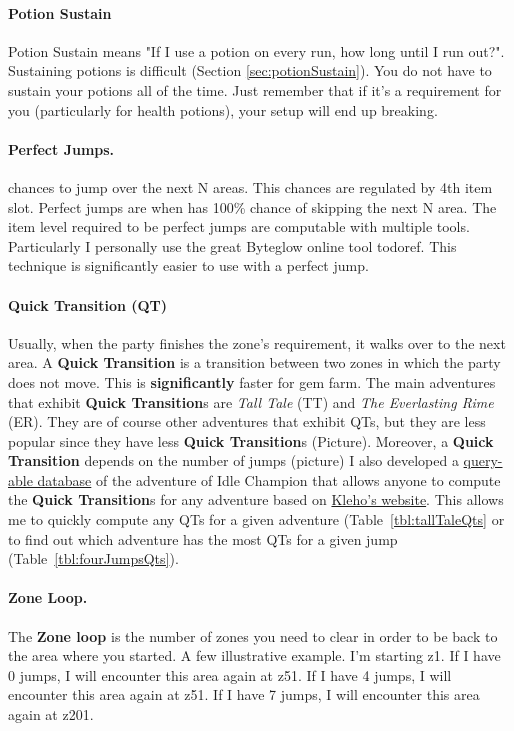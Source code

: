 \documentclass{article}
\begin{document}
\paragraph{Potion Sustain}

Potion Sustain means "If I use a potion on every run, how long until I run out?".
Sustaining potions is difficult (Section \ref{sec:potionSustain}).
You do not have to sustain your potions all of the time.
Just remember that if it's a requirement for you (particularly for health potions), your setup will end up breaking.


\paragraph{Perfect Jumps.}

\briv chances to jump over the next N areas.
This chances are regulated by \briv 4th item slot.
Perfect jumps are when \briv has 100\% chance of skipping the next N area.
The item level required to be perfect jumps are computable with multiple tools.
Particularly I personally use the great Byteglow online tool todoref.
This technique is significantly easier to use with a perfect jump. 

\paragraph{Quick Transition (QT)}

Usually, when the party finishes the zone's requirement, it walks over to the next area.
A \textbf{Quick Transition} is a transition between two zones in which the party does not move.
This is \textbf{significantly} faster for gem farm.
The main adventures that exhibit  \textbf{Quick Transition}s are \textit{Tall Tale} (TT) and \textit{The Everlasting Rime} (ER).
They are of course other adventures that exhibit QTs, but they are less popular since they have less \textbf{Quick Transition}s (Picture).
Moreover, a \textbf{Quick Transition} depends on the number of jumps (picture)
I also developed a \href{https://github.com/hogoww/IdleChampionTooling}{query-able database} of the adventure of Idle Champion that allows anyone to compute the \textbf{Quick Transition}s for any adventure  based on  \href{idle.kleho.ru/}{Kleho's website}.
This allows me to quickly compute any QTs for a given adventure (Table~\ref{tbl:tallTaleQts} or to find out which adventure has the most QTs for a given jump (Table~\ref{tbl:fourJumpsQts}).

\paragraph{Zone Loop.}
The \textbf{Zone loop} is the number of zones you need to clear in order to be back to the area where you started.
A few illustrative example.
I'm starting z1.
If I have 0 jumps, I will encounter this area again at z51.
If I have 4 jumps, I will encounter this area again at z51.
If I have 7 jumps, I will encounter this area again at z201.
\end{document}
